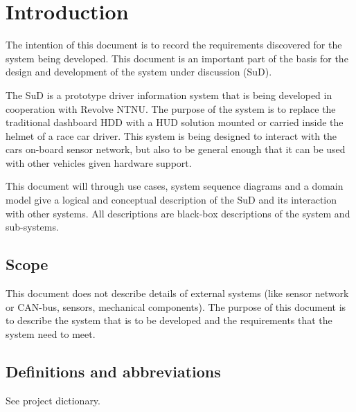 \section{Introduction}
The intention of this document is to record the requirements discovered for 
the system being developed. This document is an important part of the basis 
for the design and development of the system under discussion (SuD).

The SuD is a prototype driver information system that is being developed in
cooperation with Revolve NTNU. The purpose of the system is to replace the
traditional dashboard HDD with a HUD solution mounted or carried inside the 
helmet of a race car driver. This system is being designed to interact with 
the cars on-board sensor network, but also to be general enough that it can be
used with other vehicles given hardware support.

This document will through use cases, system sequence diagrams and a domain 
model give a logical and conceptual description of the SuD and its interaction
with other systems. All descriptions are black-box descriptions of the system
and sub-systems.

\subsection{Scope}
This document does not describe details of external systems (like sensor
network or CAN-bus, sensors, mechanical components). The purpose of this
document is to describe the system that is to be developed and the requirements
that the system need to meet. 


\subsection{Definitions and abbreviations}
See project dictionary.

